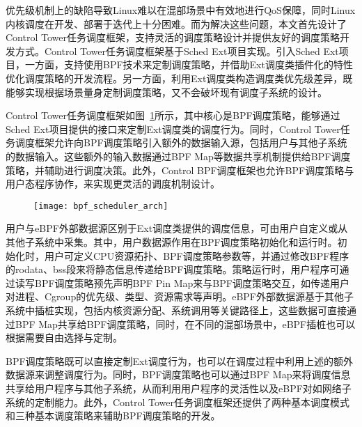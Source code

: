 优先级机制上的缺陷导致Linux难以在混部场景中有效地进行QoS保障，同时Linux内核调度在开发、部署于迭代上十分困难。而为解决这些问题，本文首先设计了Control Tower任务调度框架，支持灵活的调度策略设计并提供友好的调度策略开发方式。Control Tower任务调度框架基于Sched Ext项目实现。引入Sched Ext项目，一方面，支持使用BPF技术来定制调度策略，并借助Ext调度类插件化的特性优化调度策略的开发流程。另一方面，利用Ext调度类构造调度类优先级差异，既能够实现根据场景量身定制调度策略，又不会破坏现有调度子系统的设计。

Control Tower任务调度框架如图~\ref{fig:bpf_scheduler_arch}所示，其中核心是BPF调度策略，能够通过Sched Ext项目提供的接口来定制Ext调度类的调度行为。同时，Control Tower任务调度框架允许向BPF调度策略引入额外的数据输入源，包括用户与其他子系统的数据输入。这些额外的输入数据通过BPF Map等数据共享机制提供给BPF调度策略，并辅助进行调度决策。此外，Control BPF调度框架也允许BPF调度策略与用户态程序协作，来实现更灵活的调度机制设计。

\begin{figure}[H]
    \centering
    \texttt{[image: bpf\_scheduler\_arch]}
    \label{fig:bpf_scheduler_arch}
\end{figure}

用户与eBPF外部数据源区别于Ext调度类提供的调度信息，可由用户自定义或从其他子系统中采集。其中，用户数据源作用在BPF调度策略初始化和运行时。初始化时，用户可定义CPU资源拓扑、BPF调度策略参数等，并通过修改BPF程序的rodata、bss段来将静态信息传递给BPF调度策略。策略运行时，用户程序可通过读写BPF调度策略预先声明BPF Pin Map来与BPF调度策略交互，如传递用户对进程、Cgroup的优先级、类型、资源需求等声明。eBPF外部数据源基于其他子系统中插桩实现，包括内核资源分配、系统调用等关键路径上，这些数据可直接通过BPF Map共享给BPF调度策略，同时，在不同的混部场景中，eBPF插桩也可以根据需要自由选择与定制。

BPF调度策略既可以直接定制Ext调度行为，也可以在调度过程中利用上述的额外数据源来调整调度行为。同时，BPF调度策略也可以通过BPF Map来将调度信息共享给用户程序与其他子系统，从而利用用户程序的灵活性以及eBPF对如网络子系统的定制能力。此外，Control Tower任务调度框架还提供了两种基本调度模式和三种基本调度策略来辅助BPF调度策略的开发。 

